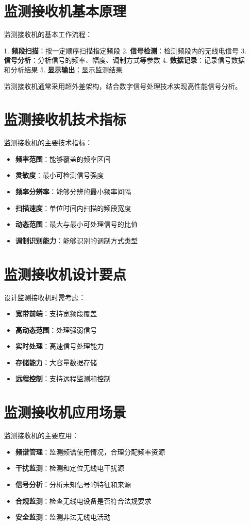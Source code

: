 \section{监测接收机基本原理}
\label{sec:monitoring_principle}

监测接收机的基本工作流程：

1. \textbf{频段扫描}：按一定顺序扫描指定频段
2. \textbf{信号检测}：检测频段内的无线电信号
3. \textbf{信号分析}：分析信号的频率、幅度、调制方式等参数
4. \textbf{数据记录}：记录信号数据和分析结果
5. \textbf{显示输出}：显示监测结果

监测接收机通常采用超外差架构，结合数字信号处理技术实现高性能信号分析。

\section{监测接收机技术指标}
\label{sec:monitoring_specifications}

监测接收机的主要技术指标：

\begin{itemize}
    \item \textbf{频率范围}：能够覆盖的频率区间
    \item \textbf{灵敏度}：最小可检测信号强度
    \item \textbf{频率分辨率}：能够分辨的最小频率间隔
    \item \textbf{扫描速度}：单位时间内扫描的频段宽度
    \item \textbf{动态范围}：最大与最小可处理信号的比值
    \item \textbf{调制识别能力}：能够识别的调制方式类型
\end{itemize}

\section{监测接收机设计要点}
\label{sec:monitoring_design}

设计监测接收机时需考虑：

\begin{itemize}
    \item \textbf{宽带前端}：支持宽频段覆盖
    \item \textbf{高动态范围}：处理强弱信号
    \item \textbf{实时处理}：高速信号处理能力
    \item \textbf{存储能力}：大容量数据存储
    \item \textbf{远程控制}：支持远程监测和控制
\end{itemize}

\section{监测接收机应用场景}
\label{sec:monitoring_applications}

监测接收机的主要应用：

\begin{itemize}
    \item \textbf{频谱管理}：监测频谱使用情况，合理分配频率资源
    \item \textbf{干扰监测}：检测和定位无线电干扰源
    \item \textbf{信号分析}：分析未知信号的特征和来源
    \item \textbf{合规监测}：检查无线电设备是否符合法规要求
    \item \textbf{安全监测}：监测非法无线电活动
\end{itemize}
